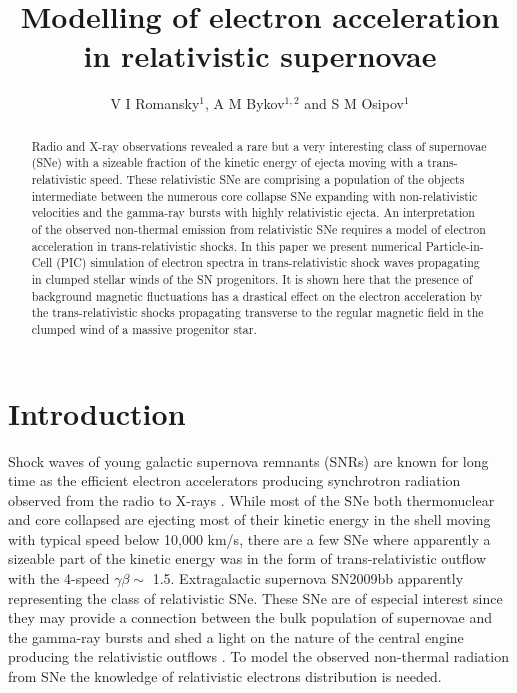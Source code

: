 \documentclass[a4paper]{jpconf}
\begin{document}
\title{Modelling of electron acceleration in relativistic supernovae}

\author{V I Romansky$^{1}$, A M Bykov$^{1,2}$ and S M Osipov$^1$}

\address{$^1$ Ioffe Institute, 26 Politekhnicheskaya st., St. Petersburg 194021, Russia}
\address{$^2$ Peter the Great St. Petersburg Polytechnic University, 29 Politekhnicheskaya st., St. Petersburg 195251, Russia}


\begin{abstract}
Radio and X-ray observations revealed a rare but a very interesting class of supernovae (SNe) with a sizeable fraction of the kinetic  energy of ejecta moving with a trans-relativistic speed.  These relativistic SNe are comprising a population of the objects intermediate between the numerous core collapse SNe expanding with non-relativistic velocities and the gamma-ray bursts with highly relativistic ejecta.  An interpretation of the observed non-thermal emission from relativistic SNe requires a model of electron acceleration in trans-relativistic shocks. In this paper we present numerical Particle-in-Cell (PIC) simulation of electron spectra in trans-relativistic shock waves propagating in clumped stellar winds of the SN progenitors. It is shown here that the presence of background magnetic fluctuations has a drastical effect on the electron acceleration by the trans-relativistic shocks propagating transverse to the regular magnetic field in the clumped wind of a massive progenitor star. 
\end{abstract}
\section{Introduction}


Shock waves of young galactic supernova remnants (SNRs) are known for long time as the efficient electron accelerators producing synchrotron radiation observed from the radio to X-rays \cite{GS64,Helder12}. While most of the SNe both thermonuclear and core collapsed are ejecting most of their kinetic energy in the shell moving with typical speed below 10,000 km/s, there are a few SNe 
where apparently a sizeable part of the kinetic energy was in the form of trans-relativistic outflow with the 4-speed $\gamma \beta \sim$ 1.5. Extragalactic supernova SN2009bb \cite{2010Natur.463..513S}  apparently representing the class of relativistic SNe. These SNe are of especial interest since they may provide a connection between the bulk population of supernovae and the gamma-ray bursts and shed a light on the nature of the central engine producing the relativistic outflows \cite{Margutti2014,2016ApJ...832..108M}. To model the observed non-thermal radiation from SNe  \cite{1998ApJ...499..810C} the knowledge 
of relativistic electrons distribution is needed.   
\end{document}
